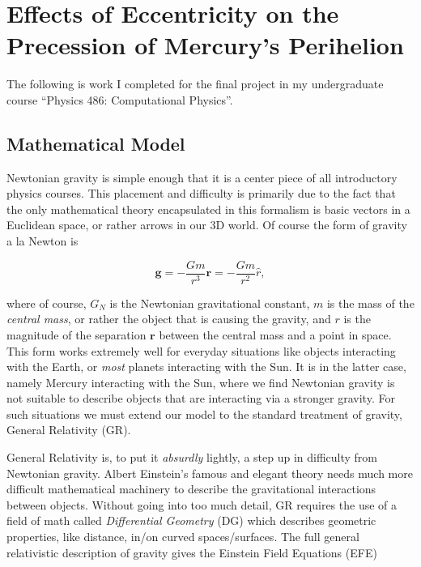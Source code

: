 \documentclass{report}
\begin{document}
    \section{Effects of Eccentricity on the Precession of Mercury's Perihelion}

        The following is work I completed for the final project in my undergraduate course ``Physics 486: Computational Physics''\cite{Chapman2019}.

        \subsection{Mathematical Model}

            Newtonian gravity is simple enough that it is a center piece of all introductory physics courses.  This placement and difficulty is primarily due to the fact that the only mathematical theory encapsulated in this formalism is basic vectors in a Euclidean space, or rather arrows in our 3D world.  Of course the form of gravity a la Newton is
        
            \begin{equation} \label{eq:Newton}
                \mathbf{g} = -\frac{G m}{r^3} \mathbf{r} = -\frac{G m}{r^2} \hat{r},
            \end{equation}
            
            where of course, $G_N$ is the Newtonian gravitational constant, $m$ is the mass of the \emph{central mass}, or rather the object that is causing the gravity, and $r$ is the magnitude of the separation $\mathbf{r}$ between the central mass and a point in space.  This form works extremely well for everyday situations like objects interacting with the Earth, or \emph{most} planets interacting with the Sun.  It is in the latter case, namely Mercury interacting with the Sun, where we find Newtonian gravity is not suitable to describe objects that are interacting via a stronger gravity.  For such situations we must extend our model to the standard treatment of gravity, General Relativity (GR).
            
            General Relativity is, to put it \emph{absurdly} lightly, a step up in difficulty from Newtonian gravity.  Albert Einstein's famous and elegant theory needs much more difficult mathematical machinery to describe the gravitational interactions between objects.  Without going into too much detail, GR requires the use of a field of math called \emph{Differential Geometry} (DG) which describes geometric properties, like distance, in/on curved spaces/surfaces.  The full general relativistic description of gravity gives the Einstein Field Equations (EFE)\cite{MTW}
            
\end{document}
